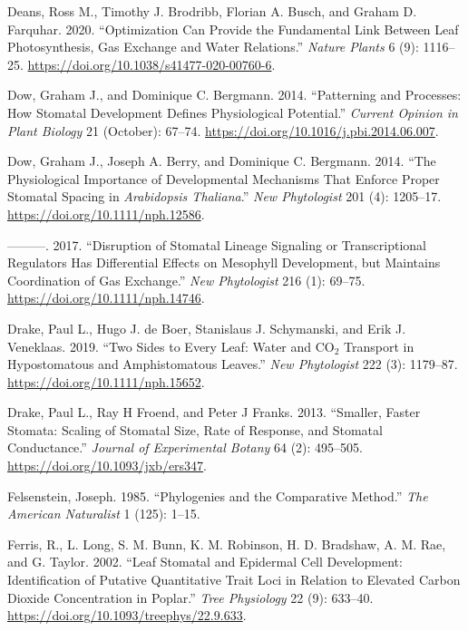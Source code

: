 \documentclass[
  12pt,
]{article}
\newlength{\cslhangindent}
\newlength{\cslentryspacingunit} %
\newenvironment{CSLReferences}[2] %
 {%
  \setlength{\parindent}{0pt}
  \ifodd #1
  \let\oldpar\par
  \def\par{\hangindent=\cslhangindent\oldpar}
  \fi
  \setlength{\parskip}{#2\cslentryspacingunit}
 }%
 {}
\begin{document}
\begin{CSLReferences}{1}{0}
\leavevmode{}%
Deans, Ross M., Timothy J. Brodribb, Florian A. Busch, and Graham D. Farquhar. 2020. {``Optimization Can Provide the Fundamental Link Between Leaf Photosynthesis, Gas Exchange and Water Relations.''} \emph{Nature Plants} 6 (9): 1116--25. \url{https://doi.org/10.1038/s41477-020-00760-6}.

\leavevmode{}%
Dow, Graham J., and Dominique C. Bergmann. 2014. {``Patterning and Processes: How Stomatal Development Defines Physiological Potential.''} \emph{Current Opinion in Plant Biology} 21 (October): 67--74. \url{https://doi.org/10.1016/j.pbi.2014.06.007}.

\leavevmode{}%
Dow, Graham J., Joseph A. Berry, and Dominique C. Bergmann. 2014. {``The Physiological Importance of Developmental Mechanisms That Enforce Proper Stomatal Spacing in \emph{{Arabidopsis} Thaliana}.''} \emph{New Phytologist} 201 (4): 1205--17. \url{https://doi.org/10.1111/nph.12586}.

\leavevmode{}%
---------. 2017. {``Disruption of Stomatal Lineage Signaling or Transcriptional Regulators Has Differential Effects on Mesophyll Development, but Maintains Coordination of Gas Exchange.''} \emph{New Phytologist} 216 (1): 69--75. \url{https://doi.org/10.1111/nph.14746}.

\leavevmode{}%
Drake, Paul L., Hugo J. de Boer, Stanislaus J. Schymanski, and Erik J. Veneklaas. 2019. {``Two Sides to Every Leaf: Water and {CO}\(_{\textrm{2}}\) Transport in Hypostomatous and Amphistomatous Leaves.''} \emph{New Phytologist} 222 (3): 1179--87. \url{https://doi.org/10.1111/nph.15652}.

\leavevmode{}%
Drake, Paul L., Ray H Froend, and Peter J Franks. 2013. {``Smaller, Faster Stomata: Scaling of Stomatal Size, Rate of Response, and Stomatal Conductance.''} \emph{Journal of Experimental Botany} 64 (2): 495--505. \url{https://doi.org/10.1093/jxb/ers347}.

\leavevmode{}%
Felsenstein, Joseph. 1985. {``Phylogenies and the Comparative Method.''} \emph{The American Naturalist} 1 (125): 1--15.

\leavevmode{}%
Ferris, R., L. Long, S. M. Bunn, K. M. Robinson, H. D. Bradshaw, A. M. Rae, and G. Taylor. 2002. {``Leaf Stomatal and Epidermal Cell Development: Identification of Putative Quantitative Trait Loci in Relation to Elevated Carbon Dioxide Concentration in Poplar.''} \emph{Tree Physiology} 22 (9): 633--40. \url{https://doi.org/10.1093/treephys/22.9.633}.


\end{CSLReferences}
\end{document}
